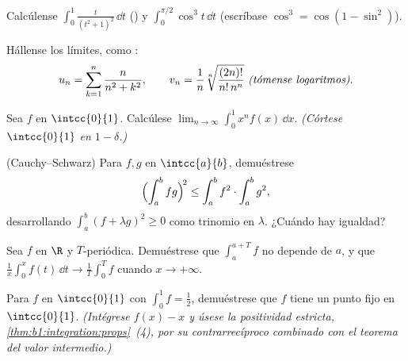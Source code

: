 \begin{exercise}[$\star$]\label{exo:b1:integration:2}
Calcúlense $\displaystyle\int_0^{1} \frac{t}{(t^2+1)^2}\,\dd t$
() y
$\displaystyle\int_0^{\pi/2} \cos^3 t\, \dd t$ (escríbase
$\cos^3 = \cos(1 - \sin^2)$).
\end{exercise}

\begin{exercise}[$\star$]\label{exo:b1:integration:3}
Hállense los límites, como :
\[
u_n = \sum_{k=1}^{n} \frac{n}{n^2 + k^2},
\qquad
v_n = \frac{1}{n}\sqrt[n]{\frac{(2n)!}{n!\,n^n}}
\ \emph{(tómense logaritmos)}.
\]
\end{exercise}

\begin{exercise}[$\star$]\label{exo:b1:integration:4}
Sea $f$  en $\intcc{0}{1}$. Calcúlese
$\lim_{n\to\infty} \int_0^1 x^n f(x)\,\dd x$. \emph{(Córtese
$\intcc{0}{1}$ en $1 - \delta$.)}
\end{exercise}

\begin{exercise}[$\star\star$]\label{exo:b1:integration:5}
(Cauchy--Schwarz) Para $f, g$  en $\intcc{a}{b}$, demuéstrese
\[
\Bigl(\int_a^b fg\Bigr)^{\!2} \leq \int_a^b f^2 \cdot \int_a^b g^2 ,
\]
desarrollando $\int_a^b (f + \lambda g)^2 \geq 0$ como trinomio en
$\lambda$. ¿Cuándo hay igualdad?
\end{exercise}

\begin{exercise}[$\star\star$]\label{exo:b1:integration:6}
Sea $f$  en $\R$ y $T$-periódica. Demuéstrese que
$\int_a^{a+T} f$ no depende de $a$, y que
$\frac1x \int_0^x f(t)\,\dd t \to \frac 1T \int_0^T f$ cuando
$x \to +\infty$.
\end{exercise}

\begin{exercise}[$\star\star$]\label{exo:b1:integration:7}
Para $f$  en $\intcc{0}{1}$ con $\int_0^1 f = \frac12$,
demuéstrese que $f$ tiene un punto fijo en $\intcc{0}{1}$.
\emph{(Intégrese $f(x) - x$ y úsese la positividad estricta,
\cref{thm:b1:integration:props}~(4), por su contrarrecíproco combinado
con el teorema del valor intermedio.)}
\end{exercise}

